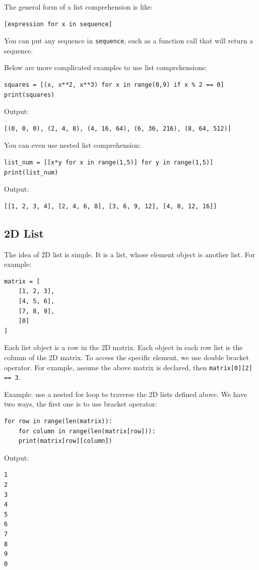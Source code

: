 \documentclass[12pt]{book}
\begin{document}
The general form of a list comprehension is like:
\begin{verbatim}
[expression for x in sequence]
\end{verbatim}
You can put any sequence in \texttt{sequence}, such as a function call that will return a sequence.

Below are more complicated examples to use list comprehensions:
\begin{verbatim}
squares = [(x, x**2, x**3) for x in range(0,9) if x % 2 == 0]
print(squares)
\end{verbatim}
Output:
\begin{verbatim}
[(0, 0, 0), (2, 4, 8), (4, 16, 64), (6, 36, 216), (8, 64, 512)]
\end{verbatim}

You can even use nested list comprehension:
\begin{verbatim}
list_num = [[x*y for x in range(1,5)] for y in range(1,5)]
print(list_num)
\end{verbatim}
Output:
\begin{verbatim}
[[1, 2, 3, 4], [2, 4, 6, 8], [3, 6, 9, 12], [4, 8, 12, 16]]
\end{verbatim}

\subsection{2D List}
\label{sec:org1988a54}
The idea of 2D list is simple. It is a list, whose element object is another list. For example:
\begin{verbatim}
matrix = [
    [1, 2, 3],
    [4, 5, 6],
    [7, 8, 9],
    [0]
]
\end{verbatim}

Each list object is a row in the 2D matrix. Each object in each row list is the column of the 2D matrix. To access the specific element, we use double bracket operator. For example, assume the above matrix is declared, then \texttt{matrix[0][2] == 3}.

Example: use a nested for loop to traverse the 2D lists defined above. We have two ways, the first one is to use bracket operator:
\begin{verbatim}
for row in range(len(matrix)):
    for column in range(len(matrix[row])):
	print(matrix[row][column])
\end{verbatim}
Output:
\begin{verbatim}
1
2
3
4
5
6
7
8
9
0
\end{verbatim}
\end{document}
